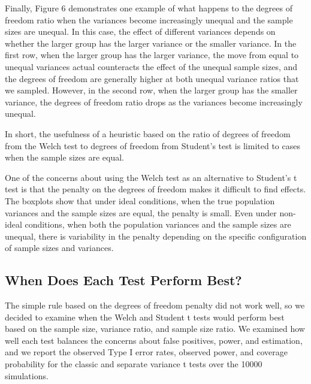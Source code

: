 \documentclass[man,a4paper,noextraspace]{apa6}\usepackage[]{graphicx}\usepackage[]{color}
\makeatletter
\newenvironment{kframe}{%
 \def\at@end@of@kframe{}%
 \ifinner\ifhmode%
  \def\at@end@of@kframe{\end{minipage}}%
  \begin{minipage}{\columnwidth}%
 \fi\fi%
 \def\FrameCommand##1{\hskip\@totalleftmargin \hskip-\fboxsep
 \colorbox{shadecolor}{##1}\hskip-\fboxsep
     \hskip-\linewidth \hskip-\@totalleftmargin \hskip\columnwidth}%
 \MakeFramed {\advance\hsize-\width
   \@totalleftmargin\z@ \linewidth\hsize
   \@setminipage}}%
 {\par\unskip\endMakeFramed%
 \at@end@of@kframe}
\newenvironment{knitrout}{}{} %
\makeatother
\begin{document}
    Finally, Figure 6 demonstrates one example of what happens to the degrees of freedom ratio when the variances become increasingly unequal and the sample sizes are unequal. In this case, the effect of different variances depends on whether the larger group has the larger variance or the smaller variance. In the first row, when the larger group has the larger variance, the move from equal to unequal variances actual counteracts the effect of the unequal sample sizes, and the degrees of freedom are generally higher at both unequal variance ratios that we sampled. However, in the second row, when the larger group has the smaller variance, the degrees of freedom ratio drops as the variances become increasingly unequal. 

\begin{knitrout}
\color{fgcolor}\begin{kframe}


{\ttfamily\noindent\bfseries\color{errorcolor}{\#\# Error: stat\_boxplot requires the following missing aesthetics: y}}\end{kframe}
\end{knitrout}

    In short, the usefulness of a heuristic based on the ratio of degrees of freedom from the Welch test to degrees of freedom from Student's test is limited to cases when the sample sizes are equal. 

    One of the concerns about using the Welch test as an alternative to Student's t test is that the penalty on the degrees of freedom makes it difficult to find effects. The boxplots show that under ideal conditions, when the true population variances and the sample sizes are equal, the penalty is small. Even under non-ideal conditions, when both the population variances and the sample sizes are unequal, there is variability in the penalty depending on the specific configuration of sample sizes and variances.

\subsection{When Does Each Test Perform Best?}
    The simple rule based on the degrees of freedom penalty did not work well, so we decided to examine when the Welch and Student t tests would perform best based on the sample size, variance ratio, and sample size ratio. We examined how well each test balances the concerns about false positives, power, and estimation, and we report the observed Type I error rates, observed power, and coverage probability for the classic and separate variance t tests over the 10000 simulations.
\end{document}
